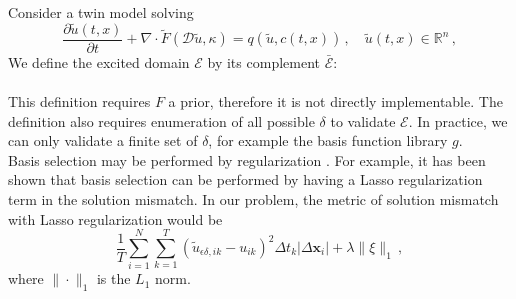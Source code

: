 \documentclass[a4paper,onecolumn]{article}
\newtheorem{definition}{Definition}
\theoremstyle{remark}
\begin{document}
\noindent Consider a twin model solving
\begin{equation}
    \frac{\partial\tilde{u}(t,x)}{\partial t} + \nabla \cdot 
    \tilde{F}(\mathcal{D} \tilde{u}, \kappa) 
    = q(\tilde{u},c(t,x))\,, \quad \tilde{u}(t,x) \in \mathbb{R}^n\,,
    \label{twin equation def}
\end{equation}
We define the excited domain $\mathcal{E}$ by its complement $\bar{\mathcal{E}}$:\\
\\

\noindent This definition requires $F$ a prior, therefore it is not directly implementable.
The definition also requires enumeration of all possible $\delta$ to validate $\mathcal{E}$.
In practice, we can only validate a finite set of $\delta$, for example the basis function library
$g$.
\\

\noindent Basis selection may be performed by regularization \cite{Lasso variable selection,
Critical review of variable selection}. 
For example, it has been shown that basis selection can be performed by having a
Lasso regularization term in the solution mismatch. In our problem, the metric of
solution mismatch with Lasso regularization would be
\begin{equation}
    \frac{1}{T}
    \sum_{i=1}^{N}\sum_{k=1}^{T} \left(\tilde{u}_{\epsilon\delta, ik} - u_{ik}\right)^2 \Delta t_k
    \left| \Delta \mathbf{x}_i \right|
    + \lambda \|\xi\|_1\,,
    \label{Lasso mismatch}
\end{equation}
where $\|\cdot\|_1$ is the $L_1$ norm. \\
\end{document}
